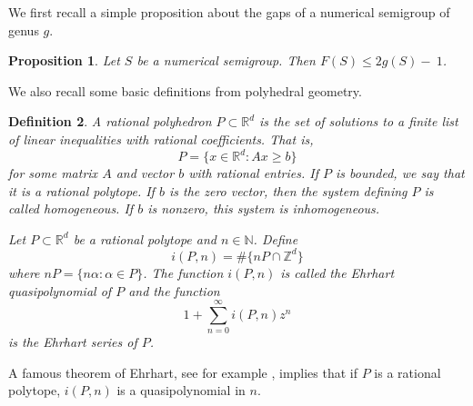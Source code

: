 \documentclass[12pt]{amsart}
\newcommand{\Z}{{\mathbb Z}}
\newcommand{\N}{{\mathbb N}}
\newcommand{\R}{{\mathbb R}}
\theoremstyle{plain}\newtheorem{proposition}{Proposition}[section]
\newtheorem{defn}[proposition]{Definition}
\newtheorem{prop}[proposition]{Proposition}
\begin{document}
We first recall a simple proposition about the gaps of a numerical semigroup of genus $g$.
\begin{prop}\label{prop:Fbound}\cite[Lemma 2.14]{GarciaSanchez_Rosales}
Let $S$ be a numerical semigroup.  Then $F(S) \le 2g(S)-~1$.
\end{prop}

We also recall some basic definitions from polyhedral geometry.
\begin{defn}
A \emph{rational polyhedron} $P \subset \R^d$ is the set of solutions to a finite list of linear inequalities with rational coefficients.  That is,
\[
P = \{x \in \R^d \colon A x \ge b\}
\]
for some matrix $A$ and vector $b$ with rational entries.  If $P$ is bounded, we say that it is a \emph{rational polytope}.  If $b$ is the zero vector, then the system defining $P$ is called \emph{homogeneous}. If $b$ is nonzero, this system is \emph{inhomogeneous}.

Let $P \subset \R^d$ be a rational polytope and $n\in \N$. Define 
\[
i(P,n) = \#\{nP\cap \Z^d\}
\]
where $nP = \{n \alpha\colon \alpha \in P\}$.  The function $i(P,n)$ is called the \emph{Ehrhart quasipolynomial} of $P$ and the function
\[
1+ \sum_{n=0}^\infty i(P,n) z^n
\]
is the \emph{Ehrhart series} of $P$.
\end{defn}
A famous theorem of Ehrhart, see for example \cite[Theorem 4.6.8]{StanleyEC1}, implies that if $P$ is a rational polytope, $i(P,n)$ is a quasipolynomial in $n$.
\end{document}
